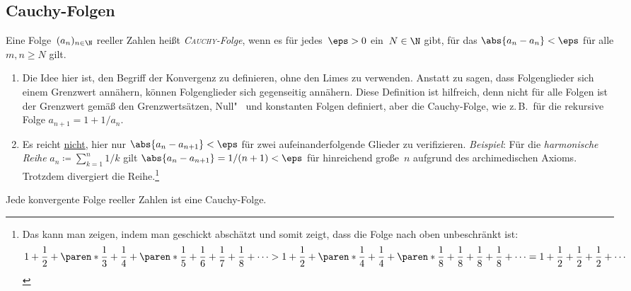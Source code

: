 \documentclass[a4paper]{article}
\begin{document}
\subsection{Cauchy-Folgen}

\begin{definition}\label{def:cauchysequence}
    Eine Folge~$(a_n)_{n \in \N}$ reeller Zahlen heißt \emph{\textsc{Cauchy}-Folge}, wenn es für jedes~$\eps > 0$ ein~$N \in \N$ gibt, für das $\abs{a_n - a_n} < \eps$ für alle $m, n \geq N$ gilt.
\end{definition}

\begin{remark}\leavevmode
    \begin{enumerate}
        \item Die Idee hier ist, den Begriff der Konvergenz zu definieren, ohne den Limes zu verwenden. Anstatt zu sagen, dass Folgenglieder sich einem Grenzwert annähern, können Folgenglieder sich gegenseitig annähern. Diese Definition ist hilfreich, denn nicht für alle Folgen ist der Grenzwert gemäß den Grenzwertsätzen, Null"~ und konstanten Folgen definiert, aber die Cauchy-Folge, wie z.\,B.\ für die rekursive Folge $a_{n+1} = 1 + 1/a_n$.
        \item Es reicht \underline{nicht}, hier nur $\abs{a_n - a_{n+1}} < \eps$ für zwei aufeinanderfolgende Glieder zu verifizieren. \emph{Beispiel}: Für die \emph{harmonische Reihe} $a_n \coloneqq \sum_{k=1}^n 1/k$ gilt $\abs{a_n - a_{n+1}} = 1/(n+1) < \eps$ für hinreichend große~$n$ aufgrund des archimedischen Axioms. Trotzdem divergiert die Reihe.\footnote{Das kann man zeigen, indem man geschickt abschätzt und somit zeigt, dass die Folge nach oben unbeschränkt ist:
                  \begin{equation*}
                      1 + \frac{1}{2} + \paren*{\frac{1}{3} + \frac{1}{4}} + \paren*{\frac{1}{5} + \frac{1}{6} + \frac{1}{7} + \frac{1}{8}} + \dots > 1 + \frac{1}{2} + \paren*{\frac{1}{4} + \frac{1}{4}} + \paren*{\frac{1}{8} + \frac{1}{8} + \frac{1}{8} + \frac{1}{8}} + \dots = 1 + \frac{1}{2} + \frac{1}{2} + \frac{1}{2} + \cdots
                  \end{equation*}}
    \end{enumerate}
\end{remark}

\begin{theorem}\label{thm:convergencecauchy}
    Jede konvergente Folge reeller Zahlen ist eine Cauchy-Folge.
\end{theorem}
\end{document}
